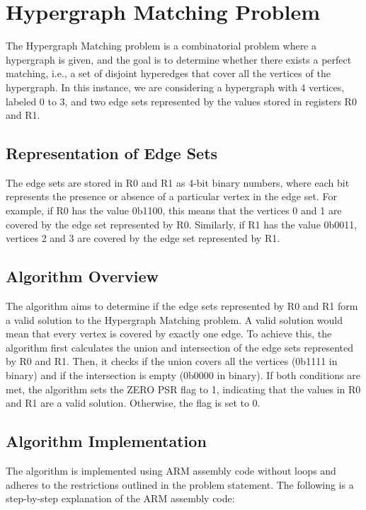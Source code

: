 \section{Hypergraph Matching Problem}

The Hypergraph Matching problem is a combinatorial problem where a hypergraph is given, and the goal is to determine whether there exists a perfect matching, i.e., a set of disjoint hyperedges that cover all the vertices of the hypergraph. In this instance, we are considering a hypergraph with 4 vertices, labeled 0 to 3, and two edge sets represented by the values stored in registers R0 and R1.

\subsection{Representation of Edge Sets}

The edge sets are stored in R0 and R1 as 4-bit binary numbers, where each bit represents the presence or absence of a particular vertex in the edge set. For example, if R0 has the value 0b1100, this means that the vertices 0 and 1 are covered by the edge set represented by R0. Similarly, if R1 has the value 0b0011, vertices 2 and 3 are covered by the edge set represented by R1.

\subsection{Algorithm Overview}

The algorithm aims to determine if the edge sets represented by R0 and R1 form a valid solution to the Hypergraph Matching problem. A valid solution would mean that every vertex is covered by exactly one edge. To achieve this, the algorithm first calculates the union and intersection of the edge sets represented by R0 and R1. Then, it checks if the union covers all the vertices (0b1111 in binary) and if the intersection is empty (0b0000 in binary). If both conditions are met, the algorithm sets the ZERO PSR flag to 1, indicating that the values in R0 and R1 are a valid solution. Otherwise, the flag is set to 0.

\subsection{Algorithm Implementation}

The algorithm is implemented using ARM assembly code without loops and adheres to the restrictions outlined in the problem statement. The following is a step-by-step explanation of the ARM assembly code:

